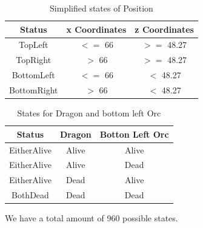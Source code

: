 \documentclass{article}
\begin{document}
  \begin{table}[h!]
    \centering
    \caption{Simplified states of Position}
    \label{tab:positionStates2}
    \begin{tabular}{c|c|c}
      \textbf{Status} & \textbf{x Coordinates} & \textbf{z Coordinates}\\
      \hline
      TopLeft & $<=$ 66 & $>=$ 48.27\\
      TopRight & $>$ 66 & $>=$ 48.27\\
      BottomLeft & $<=$ 66 & $<$ 48.27\\
      BottomRight & $>$ 66 & $<$ 48.27\\
    \end{tabular}
  \end{table}
  \begin{table}[h!]
    \centering
    \caption{States for Dragon and bottom left Orc}
    \label{tab:enemiesStates2}
    \begin{tabular}{c|c|c}
      \textbf{Status} & \textbf{Dragon} & \textbf{Botton Left Orc}\\
      \hline
      EitherAlive & Alive & Alive\\
      EitherAlive & Alive & Dead\\
      EitherAlive & Dead & Alive\\
      BothDead & Dead & Dead\\
    \end{tabular}
  \end{table}
  \noindent
  We have a total amount of 960 possible states.
\end{document}
